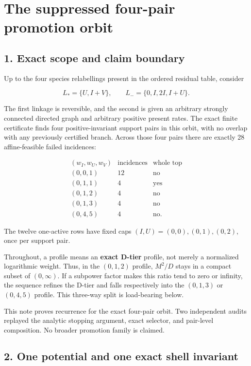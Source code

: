 \section{The suppressed four-pair promotion
orbit}

\subsection{1. Exact scope and claim
boundary}

Up to the four species relabellings present in the ordered residual
table, consider

\[
 L_*=\{U,I+V\},\qquad L_-=\{0,I,2I,I+U\}.              \tag{1.1}
\]

The first linkage is reversible, and the second is given an arbitrary
strongly connected directed graph and arbitrary positive present rates.
The exact finite certificate finds four positive-invariant support pairs
in this orbit, with no overlap with any previously certified branch.
Across those four pairs there are exactly 28 affine-feasible failed
incidences:

\[
\begin{array}{c|c|c}
(w_I,w_U,w_V)&\text{incidences}&\text{whole top}\\ \hline
(0,0,1)&12&\text{no}\\
(0,1,1)&4&\text{yes}\\
(0,1,2)&4&\text{no}\\
(0,1,3)&4&\text{no}\\
(0,4,5)&4&\text{no}.
\end{array}                                            \tag{1.2}
\]

The twelve one-active rows have fixed caps \((I,U)=(0,0),(0,1),(0,2)\),
once per support pair.

Throughout, a profile means an \textbf{exact D-tier} profile, not merely
a normalized logarithmic weight. Thus, in the \((0,1,2)\) profile,
\(M^2/D\) stays in a compact subset of \((0,\infty)\). If a subpower
factor makes this ratio tend to zero or infinity, the sequence refines
the D-tier and falls respectively into the \((0,1,3)\) or \((0,4,5)\)
profile. This three-way split is load-bearing below.

This note proves recurrence for the exact four-pair orbit. Two
independent audits replayed the analytic stopping argument, exact
selector, and pair-level composition. No broader promotion family is
claimed.

\subsection{2. One potential and one exact shell
invariant}

